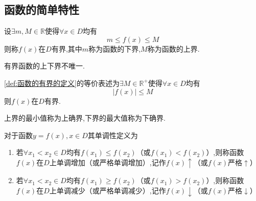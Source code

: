 \subsection{函数的简单特性}
\begin{formal}
    \begin{definition}[函数的有界的定义]\label{def:函数的有界的定义}
        设$\exists m,M\in \mathbb{R}$使得$\forall x\in D$均有\[
        m\leqslant f\left(x\right)\leqslant M
        \]则称$f\left(x\right)$在$D$有界,其中$m$称为函数的下界,$M$称为函数的上界.
    \end{definition}
\end{formal}
\begin{red}
\begin{remark}
    有界函数的上下界不唯一.
\end{remark}
\end{red}
\begin{formal}
    \begin{definition}[函数有界的等价定义]\label{def:函数有界的等价定义}
        \cref{def:函数的有界的定义}的等价表述为$\exists M\in\mathbb{R}^+$使得$\forall x\in D$均有\[
        \left|f\left(x\right)\right|\leqslant M
        \]则$f\left(x\right)$在$D$有界.
    \end{definition}
\end{formal}
\begin{formal}
    \begin{definition}[确界的定义]\label{def:确界的定义}
        上界的最小值称为上确界,下界的最大值称为下确界.
    \end{definition}
\end{formal}
\begin{formal}
    \begin{definition}[单调性的定义]\label{def:单调性的定义}
        对于函数$y=f\left(x\right),x\in D$其单调性定义为\begin{enumerate}[label={\textup{(\arabic*)}}]
            \item 若$\forall x_1<x_2\in D$均有$f\left(x_1\right)\leqslant f\left(x_2\right)$（或$f\left(x_1\right)<f\left(x_2\right)$）,则称函数$f\left(x\right)$在$D$上单调增加（或严格单调增加）,记作$f\left(x\right)\uparrow$（或$f\left(x\right)$严格$\uparrow$）
            \item 若$\forall x_1<x_2\in D$均有$f\left(x_1\right)\geqslant f\left(x_2\right)$（或$f\left(x_1\right)>f\left(x_2\right)$）,则称函数$f\left(x\right)$在$D$上单调减少（或严格单调减少）,记作$f\left(x\right)\downarrow$（或$f\left(x\right)$严格$\downarrow$）
        \end{enumerate}
    \end{definition}
\end{formal}
